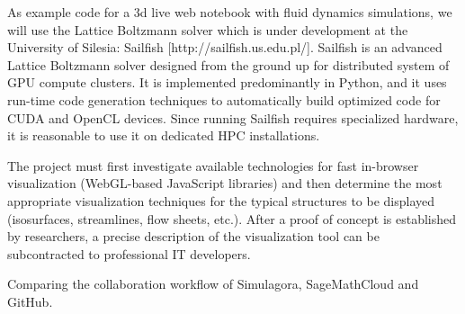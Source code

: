 \begin{workpackage}
\begin{tasklist}
\begin{task}[title=Visualization system for 3d data in web-notebook
, id=cfd-vis]
As example code for a 3d live web notebook with fluid dynamics
simulations, we will use the Lattice Boltzmann solver which is under
development at the University of Silesia: Sailfish
[http://sailfish.us.edu.pl/].  Sailfish is an advanced Lattice
Boltzmann solver designed from the ground up for distributed system of
GPU compute clusters. It is implemented predominantly in Python, and
it uses run-time code generation techniques to automatically build
optimized code for CUDA and OpenCL devices. Since running Sailfish
requires specialized hardware, it is reasonable to use it on dedicated
HPC installations.

The project must first investigate available technologies for fast
in-browser visualization (WebGL-based JavaScript libraries) and then
determine the most appropriate visualization techniques for the
typical structures to be displayed (isosurfaces, streamlines, flow
sheets, etc.).  After a proof of concept is established by
researchers, a precise description of the visualization tool can be
subcontracted to professional IT developers.
\end{task}

\begin{task}[id=mws,title=Math Search Engine,lead=JU,PM=10]
\end{task}

\begin{task}[id=simulagora,title=Simulagora collaboration,lead=LL,PM=2]
  Comparing the collaboration workflow of Simulagora, SageMathCloud and GitHub.
\end{task}

\end{tasklist}


\end{workpackage}
